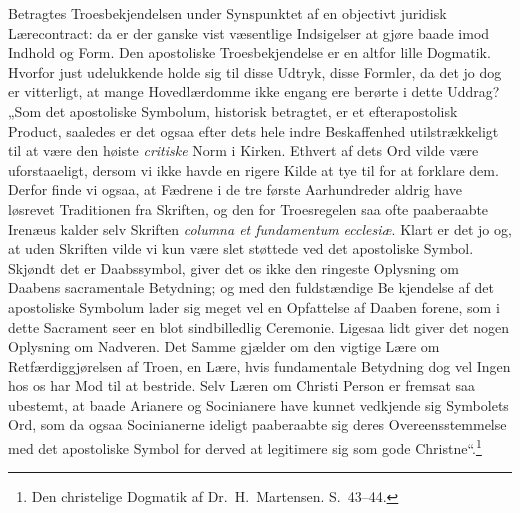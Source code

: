 \documentclass[12pt]{book}
\begin{document}
Betragtes Troesbekjendelsen under Synspunktet af en objectivt
juridisk Lærecontract: da er der ganske vist væsentlige Indsigelser
at gjøre baade imod Indhold og Form. Den apostoliske
Troesbekjendelse er en altfor lille Dogmatik. Hvorfor just
udelukkende holde sig til disse Udtryk, disse Formler, da det jo dog
er vitterligt, at mange Hovedlærdomme ikke engang ere berørte i
dette Uddrag? „Som det apostoliske Symbolum, historisk betragtet, er
et efterapostolisk Product, saaledes er det ogsaa efter dets hele
indre Beskaffenhed utilstrækkeligt til at være den høiste
\emph{critiske} Norm i Kirken. Ethvert af dets Ord vilde være
uforstaaeligt, dersom vi ikke havde en rigere Kilde at tye til for
at forklare dem. Derfor finde vi ogsaa, at Fædrene i de tre første
Aarhundreder aldrig have løsrevet Traditionen fra Skriften, og den
for Troesregelen saa ofte paaberaabte Irenæus kalder selv Skriften
\textit{columna et fundamentum ecclesiæ}. Klart er det jo og, at
uden Skriften vilde vi kun være slet støttede ved det apostoliske
Symbol. Skjøndt det er Daabssymbol, giver det os ikke den ringeste
Oplysning om Daabens sacramentale Betydning; og med den fuldstændige
Be\-
kjendelse af det apostoliske Symbolum lader sig meget vel en
Opfattelse af Daaben forene, som i dette Sacrament seer en blot
sindbilledlig Ceremonie. Ligesaa lidt giver det nogen Oplysning om
Nadveren. Det Samme gjælder om den vigtige Lære om
Retfærdiggjørelsen af Troen, en Lære, hvis fundamentale Betydning
dog vel Ingen hos os har Mod til at bestride. Selv Læren om Christi
Person er fremsat saa ubestemt, at baade Arianere og Socinianere
have kunnet vedkjende sig Symbolets Ord, som da ogsaa Socinianerne
ideligt paaberaabte sig deres Overeensstemmelse med det apostoliske
Symbol for derved at legitimere sig som gode Christne“.\footnote{Den
christelige Dogmatik af Dr.\ H.\ Martensen. S.\ 43--44.}
\end{document}
